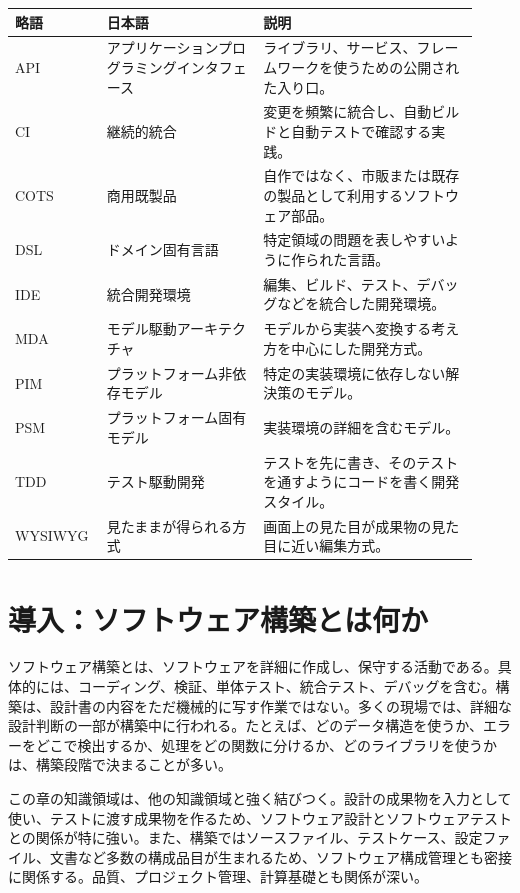\documentclass[a4paper,11pt,ja=standard,xelatex]{bxjsarticle}
\begin{document}
\begin{longtable}{L{0.16\linewidth}L{0.32\linewidth}L{0.44\linewidth}}
\toprule
\textbf{略語} & \textbf{日本語} & \textbf{説明} \\
\midrule
API & アプリケーションプログラミングインタフェース & ライブラリ、サービス、フレームワークを使うための公開された入り口。 \\
CI & 継続的統合 & 変更を頻繁に統合し、自動ビルドと自動テストで確認する実践。 \\
COTS & 商用既製品 & 自作ではなく、市販または既存の製品として利用するソフトウェア部品。 \\
DSL & ドメイン固有言語 & 特定領域の問題を表しやすいように作られた言語。 \\
IDE & 統合開発環境 & 編集、ビルド、テスト、デバッグなどを統合した開発環境。 \\
MDA & モデル駆動アーキテクチャ & モデルから実装へ変換する考え方を中心にした開発方式。 \\
PIM & プラットフォーム非依存モデル & 特定の実装環境に依存しない解決策のモデル。 \\
PSM & プラットフォーム固有モデル & 実装環境の詳細を含むモデル。 \\
TDD & テスト駆動開発 & テストを先に書き、そのテストを通すようにコードを書く開発スタイル。 \\
WYSIWYG & 見たままが得られる方式 & 画面上の見た目が成果物の見た目に近い編集方式。 \\
\bottomrule
\end{longtable}

\section*{導入：ソフトウェア構築とは何か}

ソフトウェア構築とは、ソフトウェアを詳細に作成し、保守する活動である。具体的には、コーディング、検証、単体テスト、統合テスト、デバッグを含む。構築は、設計書の内容をただ機械的に写す作業ではない。多くの現場では、詳細な設計判断の一部が構築中に行われる。たとえば、どのデータ構造を使うか、エラーをどこで検出するか、処理をどの関数に分けるか、どのライブラリを使うかは、構築段階で決まることが多い。

この章の知識領域は、他の知識領域と強く結びつく。設計の成果物を入力として使い、テストに渡す成果物を作るため、ソフトウェア設計とソフトウェアテストとの関係が特に強い。また、構築ではソースファイル、テストケース、設定ファイル、文書など多数の構成品目が生まれるため、ソフトウェア構成管理とも密接に関係する。品質、プロジェクト管理、計算基礎とも関係が深い。
\end{document}
